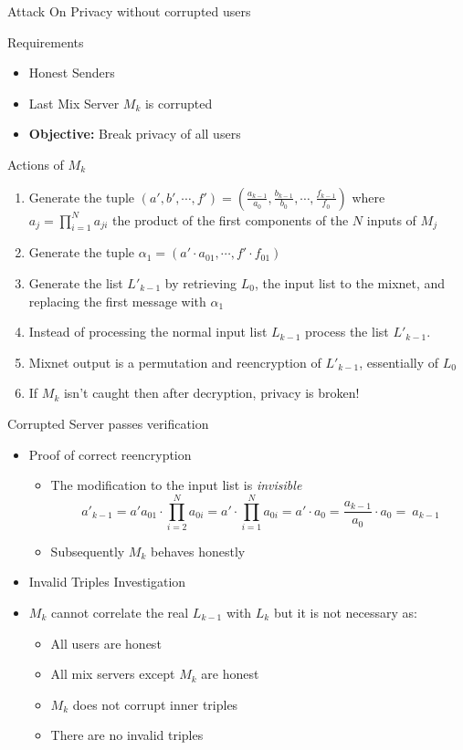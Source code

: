 \documentclass{beamer}
\begin{document}
\begin{frame}[allowframebreaks]{Attack On Privacy without corrupted users}
\begin{block}{Requirements}

\begin{itemize}
\item Honest Senders
\item Last Mix Server $M_k$ is corrupted
\item \textbf{Objective:} Break privacy of all users
\end{itemize}

\end{block}

\begin{block}{Actions of $M_k$}
\begin{enumerate}
\item Generate the tuple $(a',b', \cdots, f') = (\frac{a_{k-1}}{a_0},\frac{b_{k-1}}{b_0}, \cdots, \frac{f_{k-1}}{f_0})$
		where $a_j = \prod_{i=1}^N a_{ji}$ the product of the first components of the $N$ inputs of $M_j$
\item Generate the tuple $\alpha_1 = (a' \cdot a_{01}, \cdots, f' \cdot f_{01}) $
\item Generate the list $L'_{k-1}$ by retrieving $L_0$, the input list to the mixnet, and replacing the first message with $\alpha_1$
\item Instead of processing the normal input list $L_{k-1}$  process the list $L'_{k-1}$.
\item Mixnet output is a permutation and reencryption of $L'_{k-1}$, essentially of $L_0$
\item If $M_k$ isn't caught then after decryption, privacy is broken!
\end{enumerate}
\end{block}

\begin{block}{Corrupted Server passes verification}
\begin{itemize}
\item Proof of correct reencryption
\begin{itemize}
\item The modification to the input list is \textit{invisible}
\[ \ a'_{k-1}  = a'a_{01} \cdot \prod_{i=2}^N a_{0i} =  a' \cdot \prod_{i=1}^N a_{0i} = a' \cdot a_0 = \frac{a_{k-1}}{a_0} \cdot a_0 =  \ a_{k-1}  \]
\item Subsequently $M_k$ behaves honestly
\end{itemize}
\item Invalid Triples Investigation 
\item $M_k$ cannot correlate the real $L_{k-1}$ with $L_k$ but it is not necessary as:
\begin{itemize}
\item All users are honest
\item All mix servers except $M_k$ are honest
\item $M_k$ does not corrupt inner triples
\item There are no invalid triples
\end{itemize}
\end{itemize}
\end{block}
\end{frame}
\end{document}
